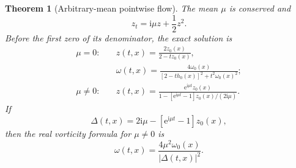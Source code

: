 \documentclass[10pt]{article}
\newcommand{\e}{\mathrm e}
\newcommand{\ii}{\mathrm i}
\newtheorem{theorem}{Theorem}
\begin{document}
\begin{theorem}[Arbitrary-mean pointwise flow]\label{thm:mobius}
The mean $\mu$ is conserved and
\begin{equation}
 z_t=\ii\mu z+\frac12z^2.                         \label{eq:riccati}
\end{equation}
Before the first zero of its denominator, the exact solution is
\begin{align}
 \mu=0:\quad &z(t,x)=\frac{2z_0(x)}{2-tz_0(x)},  \label{eq:zeroz}\\
 &\omega(t,x)=
 \frac{4\omega_0(x)}{[2-th_0(x)]^2+t^2\omega_0(x)^2}; \label{eq:zeroomega}\\
 \mu\ne0:\quad &z(t,x)=
 \frac{\e^{\ii\mu t}z_0(x)}
 {1-[\e^{\ii\mu t}-1]z_0(x)/(2\ii\mu)}.        \label{eq:nonzeroz}
\end{align}
If
\begin{equation}
 \Delta(t,x)=2\ii\mu-[\e^{\ii\mu t}-1]z_0(x),   \label{eq:delta}
\end{equation}
then the real vorticity formula for $\mu\ne0$ is
\begin{equation}
 \omega(t,x)=\frac{4\mu^2\omega_0(x)}{|\Delta(t,x)|^2}. \label{eq:nonzeroomega}
\end{equation}
\end{theorem}
\end{document}
